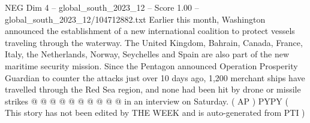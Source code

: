 \begin{textsample}{NEG Dim 4 – global\_south\_2023\_12 – Score 1.00 – global\_south\_2023\_12/104712882.txt}
Earlier this month, Washington announced the establishment of a new international coalition to protect vessels traveling through the waterway.
The United Kingdom, Bahrain, Canada, France, Italy, the Netherlands, Norway, Seychelles and Spain are also part of the new maritime security mission.
Since the Pentagon announced Operation Prosperity Guardian to counter the attacks just over 10 days ago, 1,200 merchant ships have travelled through the Red Sea region, and none had been hit by drone or missile strikes @ @ @ @ @ @ @ @ @ @ in an interview on Saturday. ( AP ) PYPY ( This story has not been edited by THE WEEK and is auto-generated from PTI )

\end{textsample}
